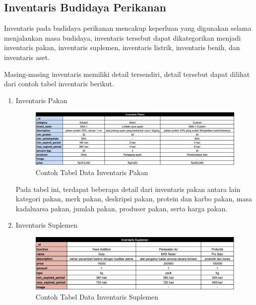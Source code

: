 \begin{spacing}{1.5}

\section{Inventaris Budidaya Perikanan}

Inventaris pada budidaya perikanan mencakup keperluan yang digunakan selama menjalankan masa budidaya, inventaris tersebut dapat dikategorikan menjadi inventaris pakan, inventaris suplemen, inventaris listrik, inventaris benih, dan inventaris aset.

Masing-masing inventaris memiliki detail tersendiri, detail tersebut dapat dilihat dari contoh tabel inventaris berikut.


\begin{enumerate}
	\item Inventaris Pakan
	
	\begin{figure}[H]
		\centering
		\includegraphics[width=1\textwidth]{gambar/tabel_inventaris_pakan.png}
		\caption{Contoh Tabel Data Inventaris Pakan}
	\end{figure}	

	Pada tabel ini, terdapat beberapa detail dari inventaris pakan antara lain kategori pakan, merk pakan, deskripsi pakan, protein dan karbo pakan, masa kadaluarsa pakan, jumlah pakan, produser pakan, serta harga pakan.

	\hfill \break
	\hfill \break
	\hfill \break
	\hfill \break


	\item Inventaris Suplemen
	
	\begin{figure}[H]
		\centering
		\includegraphics[width=1\textwidth]{gambar/tabel_inventaris_suplemen.png}
		\caption{Contoh Tabel Data Inventaris Suplemen}
	\end{figure}


\end{enumerate}
\end{spacing}
